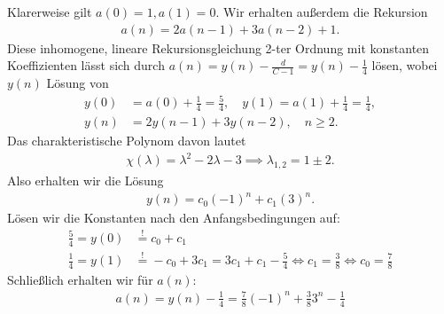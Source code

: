 \begin{solution}
Klarerweise gilt $a(0) = 1, a(1) = 0$. Wir erhalten außerdem die Rekursion
\begin{align*}
  a(n) = 2a(n-1) + 3a(n-2) + 1.
\end{align*}
Diese inhomogene, lineare Rekursionsgleichung 2-ter Ordnung mit konstanten
Koeffizienten lässt sich durch $a(n) = y(n) - \frac{d}{C-1} = y(n) - \frac{1}{4}$ lösen, wobei $y(n)$
Lösung von
\begin{align*}
  y(0) &= a(0) + \frac{1}{4} = \frac{5}{4}, \quad y(1) = a(1) + \frac{1}{4} = \frac{1}{4}, \\
  y(n) &= 2y(n-1) + 3y(n-2), \quad n \geq 2.
\end{align*}
Das charakteristische Polynom davon lautet
\begin{align*}
  \chi(\lambda) = \lambda^2 - 2\lambda - 3 \implies \lambda_{1,2} = 1 \pm 2.
\end{align*}
Also erhalten wir die Lösung
\begin{align*}
  y(n) = c_0(-1)^n + c_1(3)^n.
\end{align*}
Lösen wir die Konstanten nach den Anfangsbedingungen auf:
\begin{align*}
  \frac{5}{4} = y(0) &\stackrel{!}{=} c_0 + c_1 \\
  \frac{1}{4} = y(1) &\stackrel{!}{=} -c_0  + 3c_1 = 3c_1 + c_1 - \frac{5}{4}
  \iff c_1 = \frac{3}{8} \iff c_0 =  \frac{7}{8}
\end{align*}
Schließlich erhalten wir für $a(n)$:
\begin{align*}
  a(n) = y(n) - \frac{1}{4} = \frac{7}{8}(-1)^n + \frac{3}{8}3^n - \frac{1}{4}
\end{align*}
\end{solution}

